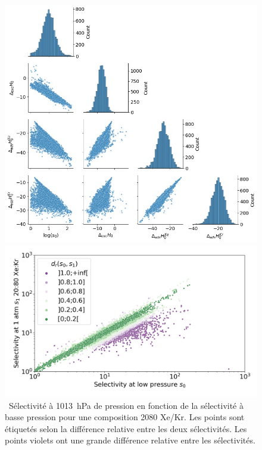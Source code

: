 \documentclass[thesis]{subfiles}
\begin{document}
\begin{otherlanguage}{french}
\begin{figure}[h]
\begin{minipage}[t]{.43\textwidth}
\centering
  \includegraphics[width=\linewidth]{figures/2-thermo/Enthalpy_0_log.jpg}
  \caption{\small{\ Pour 8\,401 MOFs avec une sélectivité Xe/Kr favorable ($s\e{0} > 1$), pair-plots entre les différentes grandeurs $\log(s\e{0})$, $\Delta\e{exc}H\e{0}$, $\Delta\e{ads}H\ex{Xe}\e{0}$ et $\Delta\e{ads}H\ex{Kr}\e{0}$ (les enthalpies sont en \si{\kilo\joule\per\mol}) en dehors de la diagonale et la distribution de chaque grandeur sur la diagonale.}}
  \label{fgr:histo_H_resume}
\end{minipage}
\hfill
\begin{minipage}[t]{.5\textwidth}
\centering
  \includegraphics[width=\linewidth]{figures/2-thermo/s_0_vs_s_2080_overview_log.jpg}
  \caption{\small{\ Sélectivité à \SI{1013}{\hecto\pascal} de pression en fonction de la sélectivité à basse pression pour une composition 20\pp{}80 Xe/Kr. Les points sont étiquetés selon la différence relative entre les deux sélectivités. Les points violets ont une grande différence relative entre les sélectivités. }}
  \label{fgr:overview_resume}
\end{minipage}
\end{figure}


\end{otherlanguage}
\end{document}
